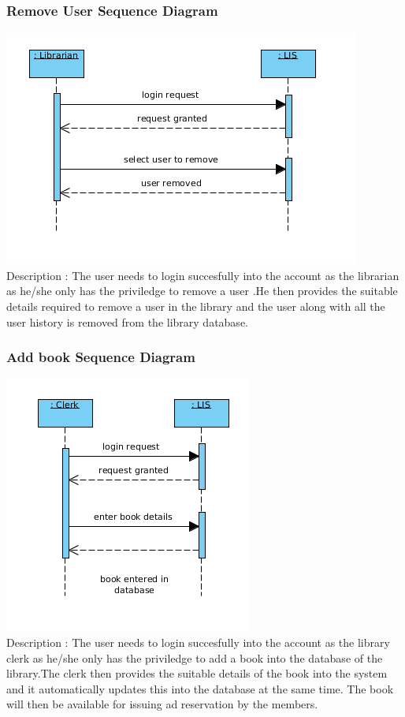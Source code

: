 \documentclass[a4paper]{article}
\begin{document}
\subsubsection*{Remove User Sequence Diagram}
\includegraphics[scale=0.50]{images/seqDiagRemoveUser.png}
\\
Description : The user needs to login succesfully into the account as the librarian as he/she only has the priviledge to remove a user .He then provides the suitable details required to remove a user in the library and the user along with all the user history is removed from the library database.
\\

\subsubsection*{Add book Sequence Diagram}
\includegraphics[scale=0.50]{images/seqDiagAddBook.png}
\\
Description : The user needs to login succesfully into the account as the library clerk as he/she only has the priviledge to add a book into the database of the library.The clerk then provides the suitable details of the book into the system and it automatically updates this into the database at the same time. The book will then be available for issuing ad reservation by the members.
\\
\end{document}
